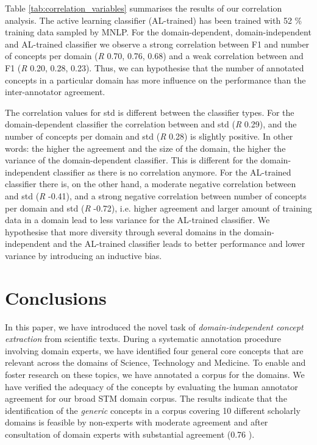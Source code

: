 \documentclass[runningheads]{llncs}
\begin{document}
Table \ref{tab:correlation_variables} summarises the results of our correlation analysis. The active learning classifier (AL-trained) has been trained with 52 \% training data sampled by MNLP.
For the domain-dependent, domain-independent and AL-trained classifier we observe a strong correlation between F1 and number of concepts per domain (\textit{R} 0.70, 0.76, 0.68) and a weak correlation between  and F1 (\textit{R} 0.20, 0.28, 0.23). Thus, we can hypothesise that the number of annotated concepts in a particular domain has more influence on the performance than the inter-annotator agreement.

The correlation values for std is different between the classifier types.
For the domain-dependent classifier the correlation between  and std (\textit{R} 0.29), and the number of concepts per domain and std (\textit{R} 0.28) is slightly positive. In other words: the higher the agreement and the size of the domain, the higher the variance of the domain-dependent classifier. This is different for the domain-independent classifier as there is no correlation anymore. For the AL-trained classifier there is, on the other hand, a moderate negative correlation between  and std (\textit{R} -0.41), and a strong negative correlation between number of concepts per domain and std (\textit{R} -0.72), i.e. higher agreement and larger amount of training data in a domain lead to less variance for the AL-trained classifier.
We hypothesise that more diversity through several domains in the domain-independent and the AL-trained classifier leads to better performance and lower variance by introducing an inductive bias.



\section{Conclusions}
In this paper, we have introduced the novel task of \textit{domain-independent concept extraction} from scientific texts. During a systematic annotation procedure involving domain experts, we have identified four general core concepts that are relevant across the domains of Science, Technology and Medicine. To enable and foster research on these topics, we have annotated a corpus for the domains.
We have verified the adequacy of the concepts by evaluating the human annotator agreement for our broad STM domain corpus.
The results indicate that the identification of the \textit{generic} concepts in a corpus covering 10 different scholarly domains is feasible by non-experts with moderate agreement and after consultation of domain experts with substantial agreement (0.76 ).
\end{document}
